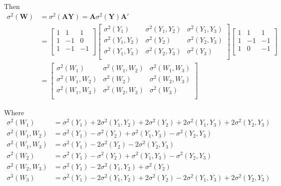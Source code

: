 \documentclass[12pt, letterpaper]{article}
\begin{document}
Then 
\begin{align*}
\sigma^{2}(\textbf{W}) &= \sigma^{2}(\textbf{A}\textbf{Y})=\textbf{A}\sigma^{2}(\textbf{Y})\textbf{A}'\\
&= \begin{bmatrix}
 1 & 1 & 1 \\
 1 & -1 & 0 \\
 1 & -1 & -1 \\
\end{bmatrix}
\begin{bmatrix}
\sigma ^2 (Y_1) & \sigma ^2 (Y_1, Y_2) & \sigma ^2 (Y_1,Y_3) \\
 \sigma ^2 (Y_1 ,Y_2) & \sigma ^2 (Y_2) & \sigma ^2 (Y_2, Y_3) \\
 \sigma ^2 (Y_1, Y_3) & \sigma ^2 (Y_2 ,Y_3) & \sigma ^2 (Y_3) \\
 \end{bmatrix} 
\begin{bmatrix}
1 & 1 & 1 \\
 1 & -1 & -1 \\
 1 & 0 & -1 \\
\end{bmatrix}\\
 &=
 \begin{bmatrix}
\sigma ^2 (W_1) & \sigma ^2 (W_1, W_2) & \sigma ^2 (W_1,W_3) \\
 \sigma ^2 (W_1 ,W_2) & \sigma ^2 (W_2) & \sigma ^2 (W_2, W_3) \\
 \sigma ^2 (W_1, W_3) & \sigma ^2 (W_2 ,W_3) & \sigma ^2 (W_3) \\
\end{bmatrix}
\end{align*}

Where 
\begin{align*}
\sigma^{2}(W_1) &= \sigma ^2 (Y_1)+2 \sigma ^2 (Y_1, Y_2)+2 \sigma ^2 (Y_2)+2 \sigma ^2 (Y_1, Y_3)+2 \sigma ^2 (Y_2 ,Y_3) \\
\sigma^{2}(W_1,W_2) &= \sigma ^2 (Y_1)-\sigma ^2 (Y_2)+\sigma ^2 (Y_1, Y_3)-\sigma ^2 (Y_2, Y_3) \\
\sigma^{2} (W_1,W_3) &= \sigma ^2 (Y_1)-2 \sigma ^2 (Y_2)-2 \sigma ^2 (Y_2, Y_3) \\
\sigma^{2}(W_{2}) &= \sigma ^2 (Y_1)-\sigma ^2 (Y_2)+\sigma ^2 (Y_1, Y_3)-\sigma ^2 (Y_2, Y_3) \\
\sigma^{2} (W_{2},W_{3}) &= \sigma ^2 (Y_1)-2 \sigma ^2 (Y_1, Y_2)+\sigma ^2 (Y_2) \\
\sigma^{3} (W_{3}) & = \sigma ^2 (Y_1)-2 \sigma ^2 (Y_1, Y_2)+2 \sigma ^2 (Y_2)-2 \sigma ^2 (Y_1, Y_3)+2 \sigma ^2 (Y_2, Y_3)
\end{align*}
\end{document}

